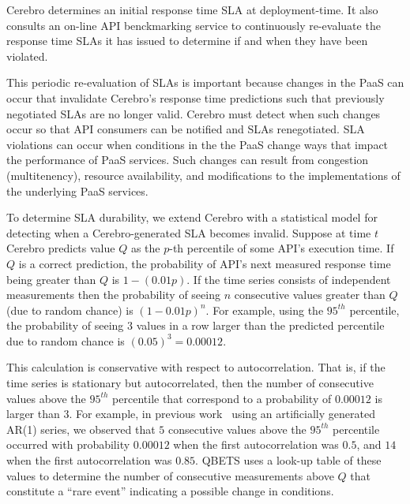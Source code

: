 Cerebro determines an initial response time SLA
at deployment-time.  It also consults an on-line API benckmarking
service to continuously re-evaluate the response time SLAs it has
issued to determine if and when they have been violated.
 

This periodic re-evaluation of SLAs is important because changes in the PaaS
can occur that invalidate Cerebro's response time predictions such that
previously negotiated SLAs are no longer valid.  Cerebro must detect when such
changes occur so that API consumers can be notified and SLAs renegotiated.
SLA violations can occur when conditions in the the PaaS change
ways that impact the performance of PaaS services.  Such changes can result
from congestion (multitenency), resource availability, and modifications to
the implementations of the underlying PaaS services. 

To determine SLA durability, we extend Cerebro with a 
statistical model for detecting when a Cerebro-generated SLA becomes invalid. 
Suppose at time $t$ Cerebro predicts value $Q$ as the $p$-th percentile of
some API's execution time.  If $Q$ is a correct prediction,
the probability of API's next measured response time being greater than 
$Q$ is $1-(0.01p)$.  If the time series consists of independent
measurements then the probability of seeing $n$ consecutive values greater
than $Q$ (due to random chance) is $(1-0.01p)^n$. 
For example, using the $95^{th}$ percentile, the probability of seeing $3$
values in a row larger than the predicted percentile due to random chance
is $(0.05)^3 = 0.00012$.

This calculation is conservative with respect to autocorrelation. That is, if
the time series is stationary but autocorrelated, then the number of consecutive 
values above the $95^{th}$ percentile that correspond to a probability of
$0.00012$ is larger than $3$.  For example, in previous
work~\cite{Nurmi:2007:QQB:1791551.1791556}
using an artificially generated AR(1) series, 
we observed that $5$ consecutive values above the $95^{th}$ percentile
occurred with probability $0.00012$ when the first autocorrelation was $0.5$,
and $14$ when the first autocorrelation was $0.85$. QBETS uses a look-up
table of these values to determine the number of consecutive measurements above
$Q$ that constitute a ``rare event'' indicating a possible change in conditions.

